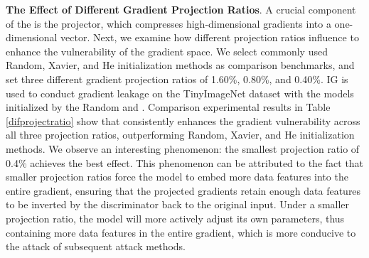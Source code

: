 \begin{table}[t]
  \centering
  \caption{Reconstruction results of IG attack ResNet18 poisoned by \name with projection ratios of 1.6\%, 0.8\%, and 0.4\%. \name at 0.4\% projection ratio achieves the best overall performance.}
  \label{difprojectratio}%
\end{table}

\textbf{The Effect of Different Gradient Projection Ratios}.
A crucial component of the \name is the projector, which compresses high-dimensional gradients into a one-dimensional vector. Next, we examine how different projection ratios influence \name to enhance the vulnerability of the gradient space. We select commonly used Random, Xavier, and He initialization methods as comparison benchmarks, and set three different gradient projection ratios of 1.60\%, 0.80\%, and 0.40\%. IG is used to conduct gradient leakage on the TinyImageNet dataset with the models initialized by the Random and \name. Comparison experimental results in Table \ref{difprojectratio} show that \name consistently enhances the gradient vulnerability across all three projection ratios, outperforming Random, Xavier, and He initialization methods. We observe an interesting phenomenon: the smallest projection ratio of 0.4\% achieves the best effect. This phenomenon can be attributed to the fact that smaller projection ratios force the model to embed more data features into the entire gradient, ensuring that the projected gradients retain enough data features to be inverted by the discriminator back to the original input. Under a smaller projection ratio, the model will more actively adjust its own parameters, thus containing more data features in the entire gradient, which is more conducive to the attack of subsequent attack methods.

